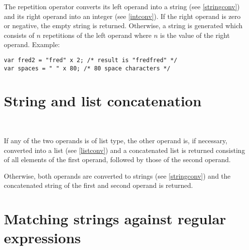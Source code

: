 \noindent
The repetition operator  converts its left operand into a string
(see \ref{stringconv}) and its right operand into an integer
(see \ref{intconv}). If the right operand is zero or negative,
the empty string is returned. Otherwise, a string is generated
which consists of $n$ repetitions of the left operand where
$n$ is the value of the right operand. Example:

\begin{lstlisting}
var fred2 = "fred" x 2; /* result is "fredfred" */
var spaces = " " x 80; /* 80 space characters */
\end{lstlisting}

\section{String and list concatenation}

\begin{grammar}
      \produces {} \\
      \produces {}
         \lextoken{\&} 
\end{grammar}

\noindent
If any of the two operands is of list type, the other operand is, if
necessary, converted into a list (see \ref{listconv}) and a
concatenated list is returned consisting of all elements of the
first operand, followed by those of the second operand.

Otherwise, both operands are converted to strings (see \ref{stringconv})
and the concatenated string of the first and second operand is returned.

\section{Matching strings against regular expressions}

\begin{grammar}
      \produces {} \\
      \produces {}
         \lextoken{=\tildeSY}  \\
      \produces {}
         \lextoken{=\tildeSY} 
\end{grammar}

